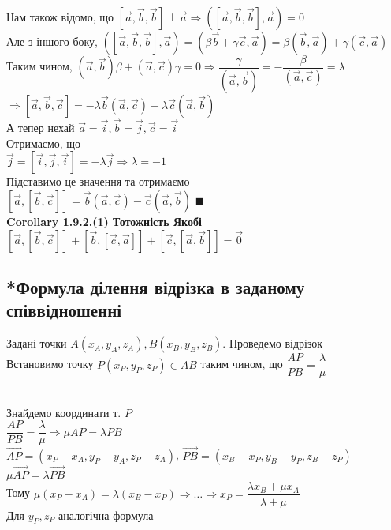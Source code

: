 \documentclass[a4paper, 14pt]{extarticle}
\def\crl#1{\textbf{Corollary {#1}}}
\def\bigline{\vspace{5mm}\\}
\def\qed{$\blacksquare$}
\begin{document}
Нам також відомо, що $[\vec{a},\vec{b},\vec{b}] \perp \vec{a} \Rightarrow ([\vec{a}, \vec{b}, \vec{b}], \vec{a}) = 0$\\
Але з іншого боку, $([\vec{a}, \vec{b}, \vec{b}], \vec{a}) = (\beta \vec{b} + \gamma \vec{c}, \vec{a}) = \beta (\vec{b}, \vec{a}) + \gamma (\vec{c}, \vec{a})$\\
Таким чином, $(\vec{a}, \vec{b}) \beta + (\vec{a}, \vec{c}) \gamma = 0 \Rightarrow \dfrac{\gamma}{(\vec{a}, \vec{b})} = - \dfrac{\beta}{(\vec{a}, \vec{c})} = \lambda$\\
$\Rightarrow [\vec{a}, \vec{b}, \vec{c}] = -\lambda \vec{b} (\vec{a}, \vec{c}) + \lambda \vec{c} (\vec{a}, \vec{b})$\\
А тепер нехай $\vec{a} = \vec{i}, \vec{b} = \vec{j}, \vec{c} = \vec{i}$\\
Отримаємо, що\\
$\vec{j} = [\vec{i}, \vec{j}, \vec{i}] = -\lambda \vec{j} \Rightarrow \lambda = -1$\\
Підставимо це значення та отримаємо\\
$[\vec{a},[\vec{b},\vec{c}]] = \vec{b} (\vec{a}, \vec{c}) - \vec{c} (\vec{a}, \vec{b})$ \qed
\bigline
\crl{1.9.2.(1) Тотожність Якобі}\\
$[\vec{a}, [\vec{b}, \vec{c}]] + [\vec{b}, [\vec{c}, \vec{a}]] + [\vec{c}, [\vec{a}, \vec{b}]] = \vec{0}$\\

\subsection{*Формула ділення відрізка в заданому співвідношенні}
Задані точки $A(x_A,y_A,z_A), B(x_B,y_B,z_B)$. Проведемо відрізок\\
Встановимо точку $P(x_P,y_P,z_P) \in AB$ таким чином, що $\dfrac{AP}{PB} = \dfrac{\lambda}{\mu}$\\
\\
Знайдемо координати т. $P$\\
$\dfrac{AP}{PB} = \dfrac{\lambda}{\mu} \Rightarrow \mu AP = \lambda PB$\\
$\overrightarrow{AP} = (x_P - x_A, y_P - y_A, z_P - z_A)$, $\overrightarrow{PB} = (x_B - x_P, y_B - y_P, z_B - z_P)$\\
$\mu \overrightarrow{AP} = \lambda \overrightarrow{PB}$\\
Тому $\mu (x_P - x_A) = \lambda (x_B - x_P) \Rightarrow \dots \Rightarrow x_P = \dfrac{\lambda x_B + \mu x_A}{\lambda + \mu}$\\
Для $y_P, z_P$ аналогічна формула
\newpage
\end{document}
